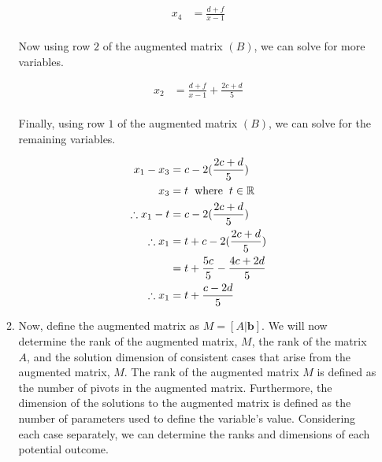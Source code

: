 \documentclass[a4paper]{article}
\begin{document}
\begin{enumerate}[label=\textbf{\arabic*.}]
\begin{enumerate}
				\begin{align*}
				x_4 & = \frac{d + f}{x - 1}\\
				\end{align*}

				Now using row $2$ of the augmented matrix $(B)$, we can solve for more variables.

				\begin{align*}
				x_2 & = \frac{d + f}{x - 1} + \frac{2c + d}{5}\\
				\end{align*}

				Finally, using row $1$ of the augmented matrix $(B)$, we can solve for the remaining variables.

				\begin{align*}
				x_1 - x_3 & = c - 2(\frac{2c + d}{5})\\
				x_3 & = t \hspace{2mm} \text{where} \hspace{2mm} t \in \mathbb{R}\\
				\therefore x_1 - t & = c - 2(\frac{2c + d}{5})\\
				\therefore x_1 & = t + c - 2(\frac{2c + d}{5})\\
				& = t + \frac{5c}{5}-\frac{4c + 2d}{5}\\
				\therefore x_1 & = t + \frac{c - 2d}{5}\\
				\end{align*}

				\item Now, define the augmented matrix as $M = [A|\textbf{b}]$. We will now determine the rank of the augmented matrix, $M$, the rank of the matrix $A$, and the solution dimension of consistent cases that arise from the augmented matrix, $M$. The rank of the augmented matrix $M$ is defined as the number of pivots in the augmented matrix. Furthermore, the dimension of the solutions to the augmented matrix is defined as the number of parameters used to define the variable's value. 
				\bigbreak
				Considering each case separately, we can determine the ranks and dimensions of each potential outcome.


\end{enumerate}
\end{enumerate}
\end{document}
